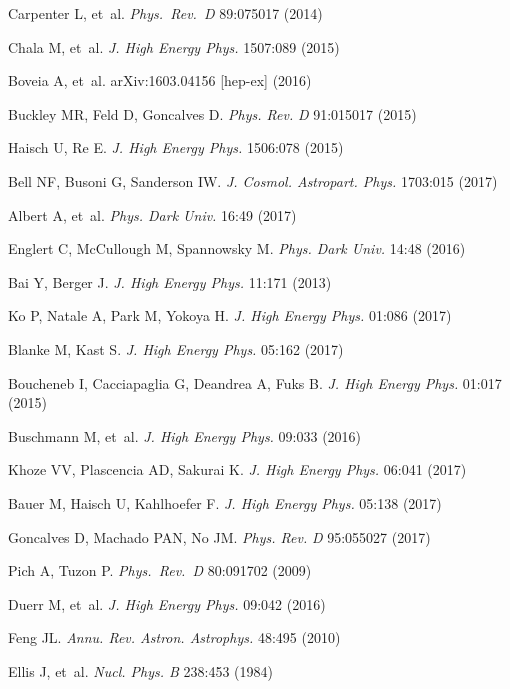 \documentclass{ar-1col}
\begin{document}
{\begin{thebibliography}{175}
Carpenter L, et~al. \textit{Phys.\ Rev.\ D} 89:075017 (2014)

Chala M, et~al. \textit{J. High Energy Phys.} {1507}:089 (2015)

Boveia A, et~al. arXiv:1603.04156 [hep-ex] (2016)

Buckley MR, Feld D, Goncalves D. \textit{Phys. Rev.} \textit{D} 91:015017
(2015)

Haisch U, Re E. \textit{J. High Energy Phys.} 1506:078 (2015)

Bell NF, Busoni G, Sanderson IW. \textit{J. Cosmol. Astropart. Phys.} 1703:015 (2017)

Albert A, et~al. \textit{Phys. Dark Univ.} 16:49 (2017)

Englert C, McCullough M, Spannowsky M. \textit{Phys. Dark Univ.}
14:48 (2016)

Bai Y, Berger J. \textit{J. High Energy Phys.} 11:171 (2013)

Ko P, Natale A, Park M, Yokoya H. \textit{J. High Energy Phys.} 01:086 (2017)

Blanke M, Kast S. \textit{J. High Energy Phys.} 05:162 (2017)

Boucheneb I, Cacciapaglia G, Deandrea A, Fuks B. \textit{J. High Energy Phys.}
01:017 (2015)

Buschmann M, et~al. \textit{J. High Energy Phys.} 09:033 (2016)

Khoze VV, Plascencia AD, Sakurai K. \textit{J. High Energy Phys.} 06:041 (2017)

Bauer M, Haisch U, Kahlhoefer F. \textit{J. High Energy Phys.} 05:138 (2017)

Goncalves D, Machado PAN, No JM. \textit{Phys. Rev.} \textit{D} 95:055027
(2017)

  Pich A, Tuzon P. \textit{Phys.\ Rev.\ D} {80}:091702 (2009)

Duerr M, et~al. \textit{J. High Energy Phys.} 09:042 (2016)

Feng JL. \textit{Annu. Rev. Astron. Astrophys.} 48:495 (2010)

{Ellis} J, et~al. \textit{Nucl. Phys. B} 238:453 (1984)


\end{thebibliography}}
\end{document}
